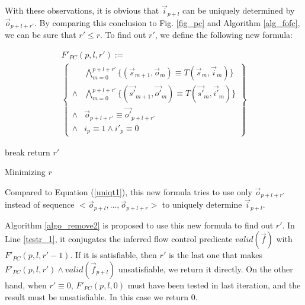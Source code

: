 \documentclass[conference]{IEEEtran}
\begin{document}
With these observations,
it is obvious that $\vec{i}_{p+l}$ can be uniquely determined by $\vec{o}_{p+l+r'}$.
By comparing this conclusion to Fig. \ref{fig_pc} and Algorithm \ref{alg_fofc},
we can be sure that $r'\le r$.
To find out $r'$, 
we define the following new formula:






\begin{multline}\label{uniqt11}
F'_{PC}(p,l,r'):=\\
\left\{
\begin{array}{cc}
&\bigwedge_{m=0}^{p+l+r'}
\{
(\vec{s}_{m+1},\vec{o}_m)\equiv T(\vec{s}_m,\vec{i}_m)
\}
\\
\wedge&\bigwedge_{m=0}^{p+l+r'}
\{
(\vec{s'}_{m+1},\vec{o'}_m)\equiv T(\vec{s'}_m,\vec{i'}_m)
\}
\\
\wedge&\vec{o}_{p+l+r'}\equiv \vec{o'}_{p+l+r'} \\
\wedge& i_{p}\equiv 1 \wedge  i'_{p}\equiv 0 
\end{array}
\right\}
\end{multline}


\begin{algorithm}[t]
\SetAlgoVlined
{} {
   {
    break
  }
}
return $r'$
\caption{Minimizing $r$}
\label{algo_remove2}
\end{algorithm}

Compared to Equation (\ref{uniqt1}),
this new formula tries to use only $\vec{o}_{p+l+r'}$ instead of 
sequence $<\vec{o}_{p+l},\dots,\vec{o}_{p+l+r}>$ to uniquely determine $\vec{i}_{p+l}$.

Algorithm \ref{algo_remove2} is proposed to use this new formula to find out $r'$.
In Line \ref{testr_1},
it conjugates the inferred flow control predicate $valid(\vec{f})$  with $F'_{PC}(p,l,r'-1)$.
If it is satisfiable,
then $r'$ is the last one that makes $F'_{PC}(p,l,r')\wedge valid(\vec{f}_{p+l})$ unsatisfiable,
we return it directly.
On the other hand,
when $r'\equiv 0$,
$F'_{PC}(p,l,0)$ must have been tested in last iteration,
and the result must be unsatisfiable.
In this case we return $0$.
\end{document}
